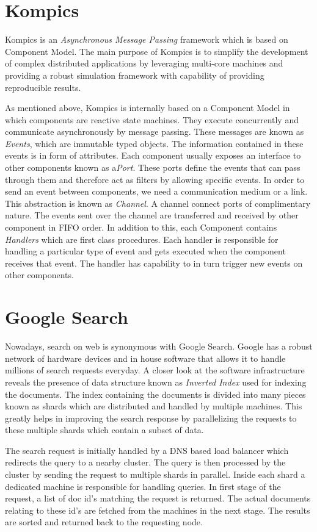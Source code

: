\documentclass[12pt,a4paper,twoside,openright]{book}
\begin{document}
\section{Kompics}
Kompics \cite{kompics} is an \textit{Asynchronous Message Passing} framework which is based on Component Model. The main purpose of Kompics is to simplify the development of complex distributed applications by leveraging multi-core machines and providing a robust simulation framework with capability of providing reproducible results. 
\par As mentioned above, Kompics is internally based on a Component Model in which components are reactive state machines. They execute concurrently and communicate asynchronously by message passing. These messages are known as \textit{Events}, which are immutable typed objects. The information contained in these events is in form of attributes. Each component usually exposes an interface to other components known as a\textit{Port}. These ports define the events that can pass through them and therefore act as filters by allowing specific events. In order to send an event between components, we need a communication medium or a link. This abstraction is known as \textit{Channel}. A channel connect ports of complimentary nature. The events sent over the channel are transferred and received by other component in FIFO order. In addition to this, each Component contains \textit{Handlers} which are first class procedures. Each handler is responsible for handling a particular type of event and gets executed when the component receives that event. The handler has capability to in turn trigger new events on other components. 


\section{Google Search}
Nowadays, search on web is synonymous with Google Search. Google has a robust network of hardware devices and in house software that allows it to handle millions of search requests everyday. A closer look at the software infrastructure \cite{googleArchitecture} reveals the presence of data structure known as \textit{Inverted Index} used for indexing the documents. The index containing the documents is divided into many pieces known as shards which are distributed and handled by multiple machines. This greatly helps in improving the search response by parallelizing the requests to these multiple shards which contain a subset of data. 
\par The search request is initially handled by a DNS based load balancer which redirects the query to a nearby cluster. The query is then processed by the cluster by sending the request to multiple shards in parallel. Inside each shard a dedicated machine is responsible for handling queries. In first stage of the request, a list of doc id's matching the request is returned. The actual documents relating to these id's are fetched from the machines in the next stage. The results are sorted and returned back to the requesting node.
\end{document}
